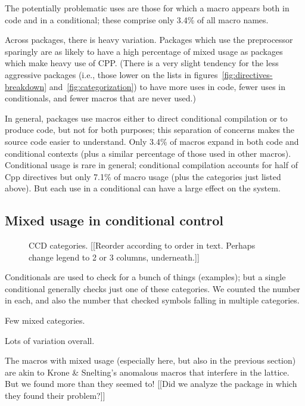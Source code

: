 \documentclass[10pt]{article}
\begin{document}
      The potentially problematic uses are those for which a macro appears
        both in code and in a conditional; these comprise only 3.4\% of all
        macro names.

      Across packages, there is heavy variation.  Packages which use
        the preprocessor sparingly are as likely to have a high percentage
        of mixed usage as packages which make heavy use of CPP.  (There is
        a very slight tendency for the less aggressive packages (i.e.,
        those lower on the lists in figures~\ref{fig:directives-breakdown}
        and~\ref{fig:categorization}) to have more uses in code, fewer uses
        in conditionals, and fewer macros that are never used.)

In general, packages use macros either to direct conditional compilation or
to produce code, but not for both purposes; this separation of concerns
makes the source code easier to understand.  Only 3.4\% of macros expand in
both code and conditional contexts (plus a similar percentage of those used
in other macros). 
Conditional usage is rare in general; conditional compilation accounts for
half of Cpp directives but only 7.1\% of macro usage (plus the categories just
listed above).  But each use in a conditional can have a large effect on
the system.


\subsection{Mixed usage in conditional control}

\begin{figure}
\centerline{}
\caption{CCD categories.  [[Reorder according to order in text.  Perhaps
  change legend to 2 or 3 columns, underneath.]]}
\label{fig:ccd-categories}
\end{figure}


    Conditionals are used to check for a bunch of things (examples); but a
      single conditional generally checks just one of these categories.  We
      counted the number in each, and also the number that checked symbols
      falling in multiple categories.

    Few mixed categories.

    Lots of variation overall.

    The macros with mixed usage (especially here, but also in the previous
      section) are akin to Krone \& Snelting's anomalous macros that
      interfere in the lattice.  But we found more than they seemed to!
      [[Did we analyze the package in which they found their problem?]]
      
\end{document}
